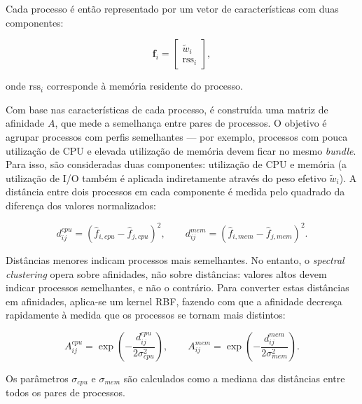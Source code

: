 Cada processo é então representado por um vetor de características com duas componentes:

\begin{equation}
    \mathbf{f}_i =
    \begin{bmatrix}
        \tilde{w}_i \\
        \mathrm{rss}_i
    \end{bmatrix},
\end{equation}

onde $\mathrm{rss}_i$ corresponde à memória residente do processo.

Com base nas características de cada processo, é construída uma matriz de afinidade $A$, que mede a semelhança entre pares de processos. O objetivo é agrupar processos com perfis semelhantes --- por exemplo, processos com pouca utilização de \acs{CPU} e elevada utilização de memória devem ficar no mesmo \textit{bundle}.
Para isso, são consideradas duas componentes: utilização de \acs{CPU} e memória (a utilização de I/O também é aplicada indiretamente através do peso efetivo $\tilde{w}_i$).
A distância
entre dois processos em cada componente é medida pelo quadrado da diferença dos
valores normalizados:

\begin{equation}
    d^{cpu}_{ij} = \left(\hat{f}_{i,cpu} - \hat{f}_{j,cpu}\right)^2,
    \qquad
    d^{mem}_{ij} = \left(\hat{f}_{i,mem} - \hat{f}_{j,mem}\right)^2.
\end{equation}

Distâncias menores indicam processos mais semelhantes. No entanto, o \emph{spectral clustering} opera sobre afinidades, não sobre distâncias: valores altos devem indicar processos semelhantes, e não o contrário. Para converter estas
distâncias em afinidades, aplica-se um kernel RBF, fazendo com que a afinidade decresça rapidamente à medida que os processos se tornam mais distintos:

\begin{equation}
    A^{cpu}_{ij} = \exp\left(-\frac{d^{cpu}_{ij}}{2\sigma_{cpu}^{2}}\right),
    \qquad
    A^{mem}_{ij} = \exp\left(-\frac{d^{mem}_{ij}}{2\sigma_{mem}^{2}}\right).
\end{equation}

Os parâmetros $\sigma_{cpu}$ e $\sigma_{mem}$ são calculados como a mediana
das distâncias entre todos os pares de processos.

